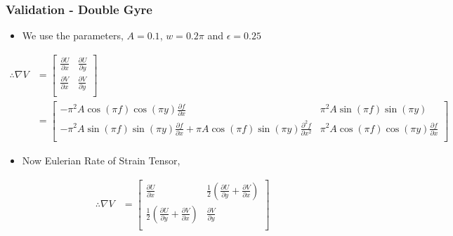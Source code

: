 \documentclass[../presentation.tex]{subfiles}
\begin{document}
\begin{frame}
  \frametitle{Validation - Double Gyre}

  \begin{itemize}
    \item We use the parameters, \(A = 0.1\), \(w = 0.2\pi\) and \(\epsilon = 0.25\)
  \end{itemize}
  
  {\tiny
    \begin{equation}
      \begin{aligned}
        \therefore \nabla V &= \begin{bmatrix}
          \frac{\partial U}{\partial x} & \frac{\partial U}{\partial y} \\[12pt]
          \frac{\partial V}{\partial x} & \frac{\partial V}{\partial y} \\
        \end{bmatrix} \\
        &= \begin{bmatrix}
          -\pi^2 A\cos(\pi f)\cos(\pi y) \frac{\partial f}{\partial x} & \pi^2 A\sin(\pi f)\sin(\pi y) \\[12pt]
          -\pi^2 A\sin(\pi f)\sin(\pi y)\frac{\partial f}{\partial x} + \pi A\cos(\pi f)\sin(\pi y) \frac{\partial^2 f}{\partial x^2} & \pi^2 A\cos(\pi f)\cos(\pi y)\frac{\partial f}{\partial x} \\
        \end{bmatrix}
      \end{aligned}
    \end{equation}
  }

  \begin{itemize}
    \item Now Eulerian Rate of Strain Tensor,
  \end{itemize}
  \begin{equation}
    \begin{aligned}
      \therefore \nabla V &= \begin{bmatrix}
        \frac{\partial U}{\partial x} & \frac{1}{2} (\frac{\partial U}{\partial y} + \frac{\partial V}{\partial x}) \\[12pt]
        \frac{1}{2} (\frac{\partial U}{\partial y} + \frac{\partial V}{\partial x}) & \frac{\partial V}{\partial y} \\
      \end{bmatrix} \\
    \end{aligned}
  \end{equation}
\end{frame}
\end{document}

